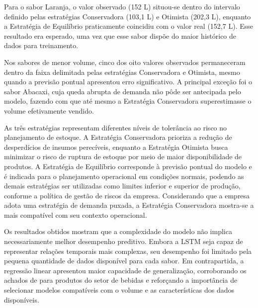 Para o sabor Laranja, o valor observado (152 L) situou-se dentro do intervalo definido pelas estratégias Conservadora (103,1 L) e Otimista (202,3 L), enquanto a Estratégia de Equilíbrio praticamente coincidiu com o valor real (152,7 L). Esse resultado era esperado, uma vez que esse sabor dispõe do maior histórico de dados para treinamento.

Nos sabores de menor volume, cinco dos oito valores observados permaneceram dentro da faixa delimitada pelas estratégias Conservadora e Otimista, mesmo quando a previsão pontual apresentou erro significativo. A principal exceção foi o sabor Abacaxi, cuja queda abrupta de demanda não pôde ser antecipada pelo modelo, fazendo com que até mesmo a Estratégia Conservadora superestimasse o volume efetivamente vendido.

As três estratégias representam diferentes níveis de tolerância ao risco no planejamento de estoque. A Estratégia Conservadora prioriza a redução de desperdícios de insumos perecíveis, enquanto a Estratégia Otimista busca minimizar o risco de ruptura de estoque por meio de maior disponibilidade de produtos. A Estratégia de Equilíbrio corresponde à previsão pontual do modelo e é indicada para o planejamento operacional em condições normais, podendo as demais estratégias ser utilizadas como limites inferior e superior de produção, conforme a política de gestão de riscos da empresa. Considerando que a empresa adota uma estratégia de demanda puxada, a Estratégia Conservadora mostra-se a mais compatível com seu contexto operacional.

Os resultados obtidos mostram que a complexidade do modelo não implica necessariamente melhor desempenho preditivo. Embora a LSTM seja capaz de representar relações temporais mais complexas, seu desempenho foi limitado pela pequena quantidade de dados disponível para cada sabor. Em contrapartida, a regressão linear apresentou maior capacidade de generalização, corroborando os achados de \cite{golabek2020demand} para produtos do setor de bebidas e reforçando a importância de selecionar modelos compatíveis com o volume e as características dos dados disponíveis.